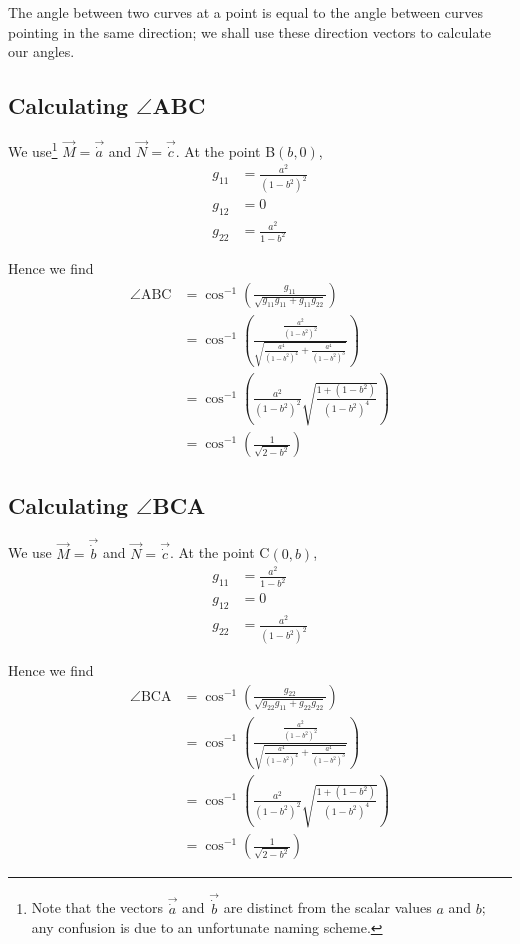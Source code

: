 \documentclass[a4paper]{article} %
\begin{document}
The angle between two curves at a point is equal to the angle between curves pointing in the same direction; we shall use these direction vectors to calculate our angles.

\subsection*{Calculating $\angle$ABC}
We use\footnote{Note that the vectors $\vec{\dot{a}}$ and $\vec{\dot{b}}$ are distinct from the scalar values $a$ and $b$; any confusion is due to an unfortunate naming scheme.} $\vec{M}=\vec{\dot{a}}$ and $\vec{N}=\vec{\dot{c}}$. At the point B$(b,0)$,
\begin{align}
g_{11}&=\frac{a^2}{(1-b^2)^2}\\
g_{12}&=0\\
g_{22}&=\frac{a^2}{1-b^2}
\end{align}

Hence we find
\begin{align}
\angle\text{ABC}&=\cos^{-1}\left(\frac{g_{11}}{\sqrt{g_{11}g_{11}+g_{11}g_{22}}}\right)\\
&=\cos^{-1}\left(\frac{\frac{a^2}{(1-b^2)^{2}}}{\sqrt{\frac{a^4}{(1-b^2)^4}+\frac{a^4}{(1-b^2)^3}}}
\right)\\
&=\cos^{-1}\left(\frac{a^2}{(1-b^2)^2}\sqrt{\frac{1+(1-b^2)}{(1-b^2)^4}}\right)\\
&=\cos^{-1}\left(\frac{1}{\sqrt{2-b^2}}\right)
\end{align}

\subsection*{Calculating $\angle$BCA}
We use $\vec{M}=\vec{\dot{b}}$ and $\vec{N}=\vec{\dot{c}}$. At the point C$(0,b)$,
\begin{align}
g_{11}&=\frac{a^2}{1-b^2}\\
g_{12}&=0\\
g_{22}&=\frac{a^2}{(1-b^2)^2}
\end{align}

Hence we find
\begin{align}
\angle\text{BCA}&=\cos^{-1}\left(\frac{g_{22}}{\sqrt{g_{22}g_{11}+g_{22}g_{22}}}\right)\\
&=\cos^{-1}\left(\frac{\frac{a^2}{(1-b^2)^{2}}}{\sqrt{\frac{a^4}{(1-b^2)^4}+\frac{a^4}{(1-b^2)^3}}}
\right)\\
&=\cos^{-1}\left(\frac{a^2}{(1-b^2)^2}\sqrt{\frac{1+(1-b^2)}{(1-b^2)^4}}\right)\\
&=\cos^{-1}\left(\frac{1}{\sqrt{2-b^2}}\right)
\end{align}
\end{document}
